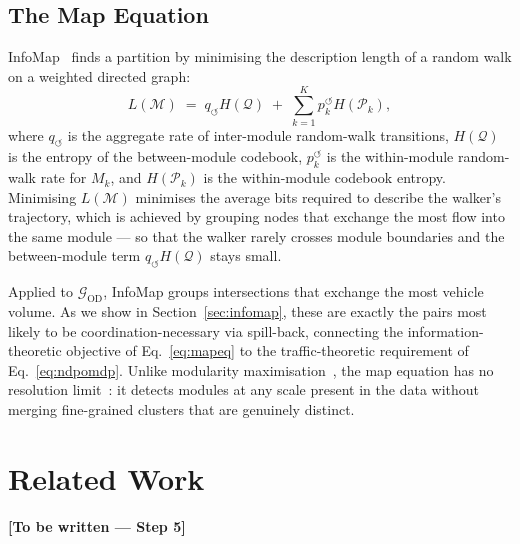 \documentclass{article}
\begin{document}
\subsection{The Map Equation}
\label{sec:mapeq}

InfoMap~\citep{rosvall2008maps,rosvall2009mapequation} finds a partition by
minimising the description length of a random walk on a weighted directed graph:
\begin{equation}
    L(\mathcal{M})
    \;=\; q_{\circlearrowleft} H(\mathcal{Q})
    \;+\; \sum_{k=1}^{K} p_k^{\circlearrowleft} H(\mathcal{P}_k),
    \label{eq:mapeq}
\end{equation}
where $q_{\circlearrowleft}$ is the aggregate rate of inter-module random-walk
transitions, $H(\mathcal{Q})$ is the entropy of the between-module codebook,
$p_k^{\circlearrowleft}$ is the within-module random-walk rate for $M_k$, and
$H(\mathcal{P}_k)$ is the within-module codebook entropy.
Minimising $L(\mathcal{M})$ minimises the average bits required to describe
the walker's trajectory, which is achieved by grouping nodes that exchange the
most flow into the same module --- so that the walker rarely crosses module
boundaries and the between-module term $q_{\circlearrowleft}H(\mathcal{Q})$
stays small.

Applied to $\mathcal{G}_{\mathrm{OD}}$, InfoMap groups intersections that
exchange the most vehicle volume.
As we show in Section~\ref{sec:infomap}, these are exactly the pairs most
likely to be coordination-necessary via spill-back, connecting the
information-theoretic objective of Eq.~\eqref{eq:mapeq} to the traffic-theoretic
requirement of Eq.~\eqref{eq:ndpomdp}.
Unlike modularity maximisation~\citep{newmangirvan2004}, the map equation has
no resolution limit~\citep{edler2023community}: it detects modules at any
scale present in the data without merging fine-grained clusters that are
genuinely distinct.

\section{Related Work}
\label{sec:related}
\textbf{[To be written — Step 5]}
\end{document}
